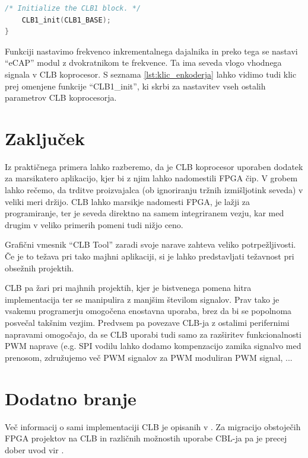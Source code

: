 \documentclass[a4paper]{article}
\begin{document}
\begin{sloppypar}
\begin{lstlisting}[language=C,
                   caption={Implementacija funkcije za nastavitev 
                            inkrementalnega dajalnika},
                   label={lst:klic_enkoderja}]
    /* Initialize the CLB1 block. */
    CLB1_init(CLB1_BASE);
}
\end{lstlisting}

Funkciji nastavimo frekvenco inkrementalnega dajalnika in preko tega se nastavi
``eCAP'' modul z dvokratnikom te frekvence. Ta ima seveda vlogo vhodnega
signala v CLB koprocesor. S seznama \ref{lst:klic_enkoderja} lahko vidimo tudi
klic prej omenjene funkcije ``CLB1\_init'', ki skrbi za nastavitev vseh ostalih
parametrov CLB koprocesorja.

\section{Zaključek}
Iz praktičnega primera lahko razberemo, da je CLB koprocesor uporaben
dodatek za marsikatero aplikacijo, kjer bi z njim lahko nadomestili FPGA čip. V
grobem lahko rečemo, da trditve proizvajalca (ob ignoriranju tržnih
izmišljotink seveda) v veliki meri držijo. CLB lahko marsikje nadomesti FPGA,
je lažji za programiranje, ter je seveda direktno na samem integriranem vezju,
kar med drugim v veliko primerih pomeni tudi nižjo ceno.

Grafični vmesnik ``CLB Tool'' zaradi svoje narave zahteva veliko
potrpežljivosti. Če je to težava pri tako majhni aplikaciji, si je lahko
predstavljati težavnost pri obsežnih projektih.

CLB pa žari pri majhnih projektih, kjer je bistvenega pomena hitra
implementacija ter se manipulira z manjšim številom signalov. Prav tako je
vsakemu programerju omogočena enostavna uporaba, brez da bi se popolnoma
posvečal takšnim vezjim. Predvsem pa povezave CLB-ja z ostalimi perifernimi napravami \cite{fpga-to-clb} omogočajo, da se CLB uporabi tudi samo za razširitev funkcionalnosti PWM naprave (e.g. SPI vodilu lahko dodamo kompenzacijo zamika signalvo med prenosom, združujemo več PWM signalov za PWM moduliran PWM signal, ...

\section{Dodatno branje}
Več informacij o sami implementaciji CLB je opisanih v \cite{clb-designing}. Za
migracijo obstoječih FPGA projektov na CLB in različnih možnostih uporabe CBL-ja pa je precej dober uvod vir
\cite{fpga-to-clb}.


\printbibliography



\end{sloppypar}
\end{document}
